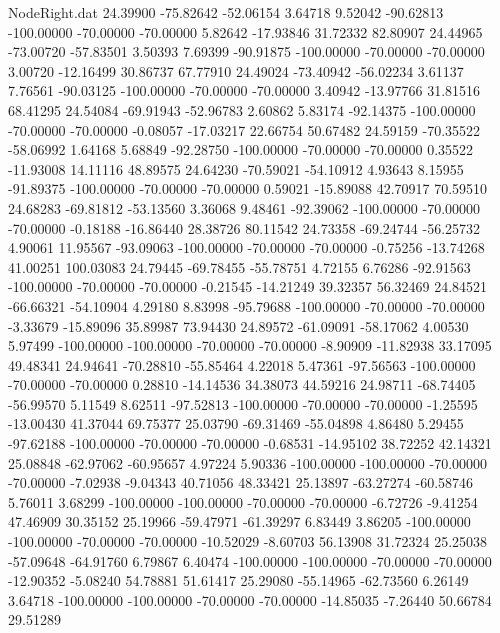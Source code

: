 \begin{filecontents}{NodeRight.dat}
  24.39900  -75.82642  -52.06154     3.64718    9.52042  -90.62813 -100.00000  -70.00000  -70.00000    5.82642  -17.93846   31.72332   82.80907
  24.44965  -73.00720  -57.83501     3.50393    7.69399  -90.91875 -100.00000  -70.00000  -70.00000    3.00720  -12.16499   30.86737   67.77910
  24.49024  -73.40942  -56.02234     3.61137    7.76561  -90.03125 -100.00000  -70.00000  -70.00000    3.40942  -13.97766   31.81516   68.41295
  24.54084  -69.91943  -52.96783     2.60862    5.83174  -92.14375 -100.00000  -70.00000  -70.00000   -0.08057  -17.03217   22.66754   50.67482
  24.59159  -70.35522  -58.06992     1.64168    5.68849  -92.28750 -100.00000  -70.00000  -70.00000    0.35522  -11.93008   14.11116   48.89575
  24.64230  -70.59021  -54.10912     4.93643    8.15955  -91.89375 -100.00000  -70.00000  -70.00000    0.59021  -15.89088   42.70917   70.59510
  24.68283  -69.81812  -53.13560     3.36068    9.48461  -92.39062 -100.00000  -70.00000  -70.00000   -0.18188  -16.86440   28.38726   80.11542
  24.73358  -69.24744  -56.25732     4.90061   11.95567  -93.09063 -100.00000  -70.00000  -70.00000   -0.75256  -13.74268   41.00251  100.03083
  24.79445  -69.78455  -55.78751     4.72155    6.76286  -92.91563 -100.00000  -70.00000  -70.00000   -0.21545  -14.21249   39.32357   56.32469
  24.84521  -66.66321  -54.10904     4.29180    8.83998  -95.79688 -100.00000  -70.00000  -70.00000   -3.33679  -15.89096   35.89987   73.94430
  24.89572  -61.09091  -58.17062     4.00530    5.97499 -100.00000 -100.00000  -70.00000  -70.00000   -8.90909  -11.82938   33.17095   49.48341
  24.94641  -70.28810  -55.85464     4.22018    5.47361  -97.56563 -100.00000  -70.00000  -70.00000    0.28810  -14.14536   34.38073   44.59216
  24.98711  -68.74405  -56.99570     5.11549    8.62511  -97.52813 -100.00000  -70.00000  -70.00000   -1.25595  -13.00430   41.37044   69.75377
  25.03790  -69.31469  -55.04898     4.86480    5.29455  -97.62188 -100.00000  -70.00000  -70.00000   -0.68531  -14.95102   38.72252   42.14321
  25.08848  -62.97062  -60.95657     4.97224    5.90336 -100.00000 -100.00000  -70.00000  -70.00000   -7.02938   -9.04343   40.71056   48.33421
  25.13897  -63.27274  -60.58746     5.76011    3.68299 -100.00000 -100.00000  -70.00000  -70.00000   -6.72726   -9.41254   47.46909   30.35152
  25.19966  -59.47971  -61.39297     6.83449    3.86205 -100.00000 -100.00000  -70.00000  -70.00000  -10.52029   -8.60703   56.13908   31.72324
  25.25038  -57.09648  -64.91760     6.79867    6.40474 -100.00000 -100.00000  -70.00000  -70.00000  -12.90352   -5.08240   54.78881   51.61417
  25.29080  -55.14965  -62.73560     6.26149    3.64718 -100.00000 -100.00000  -70.00000  -70.00000  -14.85035   -7.26440   50.66784   29.51289

\end{filecontents}
